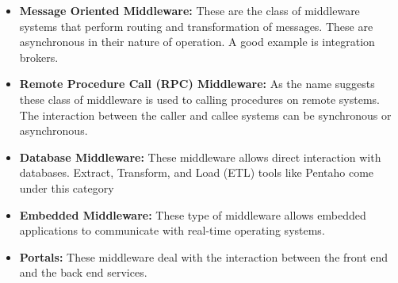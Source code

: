 \begin{itemize}
  \item \textbf{Message Oriented Middleware:} These are the class of middleware systems that perform routing and transformation of messages. These are asynchronous in their nature of operation. A good example is integration brokers. 

  \item \textbf{Remote Procedure Call (RPC) Middleware:} As the name suggests these class of middleware is used to calling procedures on remote systems. The interaction between the caller and callee systems can be synchronous or asynchronous.

  \item \textbf{Database Middleware:} These middleware allows direct interaction with databases. Extract, Transform, and Load (ETL) tools like Pentaho come under this category

  \item \textbf{Embedded Middleware:} These type of middleware allows embedded applications to communicate with real-time operating systems.

  \item \textbf{Portals:} These middleware deal with the interaction between the front end and the back end services.
\end{itemize}